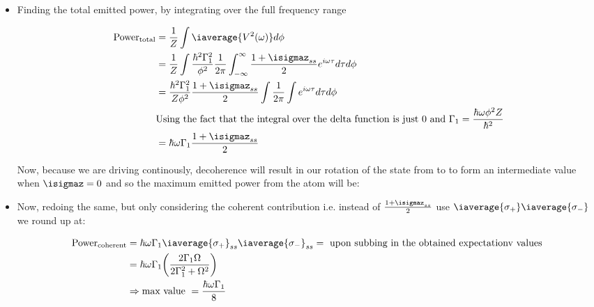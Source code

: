 \begin{itemize}
      \item  Finding  the total  emitted  power,  by  integrating over  the  full
        frequency range  
 	
 	\begin{equation}\label{feb220183}
          \begin{aligned}
            \text{Power}_\text{total} &= \frac{1}{Z}\int 	\iaverage{V^2(\omega)}  d\phi\\
            & = \frac{1}{Z}\int \frac{\hbar^2\Gamma_1^{2}}{\phi^2}\frac{1}{2\pi}\int_{-\infty}^{\infty} \frac{1+{\isigmaz}_{ss}}{2} e^{i\omega \tau}d\tau   d\phi\\
            & = \frac{\hbar^2\Gamma_1^2}{Z\phi^2} \frac{1+{\isigmaz}_{ss}}{2} \int\frac{1}{2\pi}\int e^{i\omega\tau}d\tau d\phi\\
            & \text{Using the fact that the integral over the delta function is just 0 and } \Gamma_1 = \frac{\hbar\omega\phi^2Z}{\hbar^2}\\
            & = \hbar\omega\Gamma_1 \frac{1+{\isigmaz}_{ss}}{2}
          \end{aligned}
 	\end{equation}
 	
 	\noindent  Now,  because we  are  driving  continously, decoherence  will
        result in our rotation of the state  from  to  to form an
        intermediate value when $ \isigmaz = 0 $ and so the maximum emitted power
        from the atom will be:
 	
 	
 	
      \item Now, redoing the same, but only considering the coherent contribution
        i.e.     instead    of     $     \frac{1+{\isigmaz}_{ss}}{2}    $     use
        $ \iaverage{\sigma_{+}}\iaverage{\sigma_{-}} $ we round up at:
 	
 	\begin{equation}\label{maximalCoherentEmission}
          \begin{aligned}
            \text{Power}_\text{coherent} &= \hbar\omega\Gamma_1 \iaverage{\sigma_{+}}_{ss} \iaverage{\sigma_{-}}_{ss} = \text{ upon subbing in the obtained expectationv values }\\
            &                                                                   =
            \hbar\omega\Gamma_1\bigg(\frac{2\Gamma_1\Omega}{2\Gamma_1^2+\Omega^2}\bigg)\\&\Rightarrow
            \text{max value } = \frac{\hbar\omega\Gamma_1}{8}
          \end{aligned}
 	\end{equation}
 	

\end{itemize}

